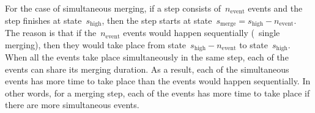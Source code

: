 \documentclass[twocolumn]{svjour3}          %
\begin{document}
For the case of simultaneous merging,
if a step consists of~$n_\mathrm{event}$ events and 
the step finishes at state~$s_\mathrm{high}$, then the step starts 
at state~$s_\mathrm{merge}=s_\mathrm{high} - n_\mathrm{event}$.
The reason is that if the~$n_\mathrm{event}$ events 
would happen sequentially (\ie~single merging),
then they would take place 
from state~$s_\mathrm{high} - n_\mathrm{event}$ to state~$s_\mathrm{high}$.
When all the events take place simultaneously in the same step, 
each of the events can share its merging duration.
As a result,
each of the simultaneous events has more time to take place
than the events would happen sequentially.
In other words, for a merging step,
each of the events has more time to take place 
if there are more simultaneous events.
\end{document}

